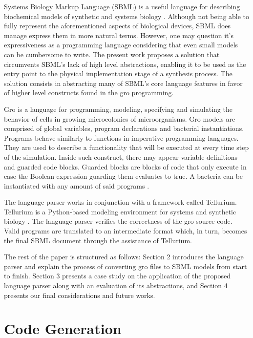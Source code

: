 \documentclass[12pt]{article}
\begin{document}
    Systems Biology Markup Language (SBML) is a useful language for describing biochemical models of synthetic and systems biology \cite{Hucka2003}. Although not being able to fully represent the aforementioned aspects of biological devices, SBML does manage express them in more natural terms. However, one may question it's expressiveness as a programming language considering that even small models can be cumbersome to write. The present work proposes a solution that circumvents SBML's lack of high level abstractions, enabling it to be used as the entry point to the physical implementation stage of a synthesis process. The solution consists in abstracting many of SBML's core language features in favor of higher level constructs found in the gro programming.
    
    Gro is a language for programming, modeling, specifying and simulating the behavior of cells in growing microcolonies of microorganisms. Gro models are comprised of global variables, program declarations and bacterial instantiations. Programs behave similarly to functions in imperative programming languages. They are used to describe a functionality that will be executed at every time step of the simulation. Inside such construct, there may appear variable definitions and guarded code blocks. Guarded blocks are blocks of code that only execute in case the Boolean expression guarding them evaluates to true. A bacteria can be instantiated with any amount of said programs \cite{Jang2012}.
    
    The language parser works in conjunction with a framework called Tellurium. Tellurium is a Python-based modeling environment for systems and synthetic biology \cite{Choi2018}. The language parser verifies the correctness of the gro source code. Valid programs are translated to an intermediate format which, in turn, becomes the final SBML document through the assistance of Tellurium.

    The rest of the paper is structured as follows: Section 2 introduces the language parser and explain the process of converting gro files to SBML models from start to finish. Section 3 presents a case study on the application of the proposed language parser along with an evaluation of its abstractions, and Section 4 presents our final considerations and future works.


\section{Code Generation}\label{sec:code-gen}
\end{document}
